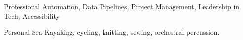 
\begin{cvskills}
  \cvskill
    {Professional} %
    {Automation, Data Pipelines, Project Management, Leadership in Tech, Accessibility} %

  \cvskill
    {Personal} %
    {Sea Kayaking, cycling, knitting, sewing, orchestral percussion.} %
\end{cvskills}
